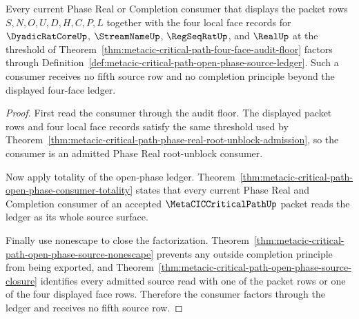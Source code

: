 \begin{theorem}
\label{thm:metacic-critical-path-phase-real-root-unblock-completeness}
Every current Phase Real or Completion consumer that displays the packet rows $S,N,O,U,D,H,C,P,L$ together with the four local face records for $\DyadicRatCoreUp$, $\StreamNameUp$, $\RegSeqRatUp$, and $\RealUp$ at the threshold of Theorem~\ref{thm:metacic-critical-path-four-face-audit-floor} factors through Definition~\ref{def:metacic-critical-path-open-phase-source-ledger}. Such a consumer receives no fifth source row and no completion principle beyond the displayed four-face ledger.
\end{theorem}
\begin{proof}
First read the consumer through the audit floor. The displayed packet rows and four local face records satisfy the same threshold used by Theorem~\ref{thm:metacic-critical-path-phase-real-root-unblock-admission}, so the consumer is an admitted Phase Real root-unblock consumer.

Now apply totality of the open-phase ledger. Theorem~\ref{thm:metacic-critical-path-open-phase-consumer-totality} states that every current Phase Real and Completion consumer of an accepted $\MetaCICCriticalPathUp$ packet reads the ledger as its whole source surface.

Finally use nonescape to close the factorization. Theorem~\ref{thm:metacic-critical-path-open-phase-source-nonescape} prevents any outside completion principle from being exported, and Theorem~\ref{thm:metacic-critical-path-open-phase-source-closure} identifies every admitted source read with one of the packet rows or one of the four displayed face rows. Therefore the consumer factors through the ledger and receives no fifth source row.
\end{proof}

